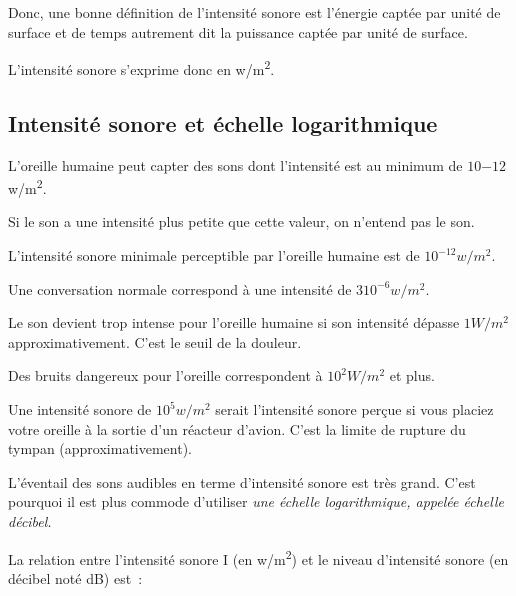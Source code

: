 Donc, une bonne définition de l'intensité sonore est l'énergie
captée par unité de surface et de temps autrement dit la puissance
captée par unité de surface. 

L'intensité sonore s'exprime donc en \si{w/m^2}.

\subsection{Intensité sonore et échelle logarithmique}

L'oreille humaine peut capter des sons dont l'intensité est
au minimum de $10{-12}$ \si{w/m^2}.

Si le son a une intensité plus petite que cette valeur, on n'entend pas
le son.

L'intensité sonore minimale perceptible par l'oreille humaine est de
$10^{-12} \si{w/m^2}$.

Une conversation normale correspond à une intensité de
$3 10^{-6} \si{w/m^2}$.

Le son devient trop intense pour l'oreille humaine si son intensité
dépasse  $1 \si{W/m^2}$ approximativement. C'est le seuil de
la douleur.

Des bruits dangereux pour l'oreille correspondent à
$10^2 \si{W/m^2}$ et plus.

Une intensité sonore de $10^5 \si{w/m^2}$ serait l'intensité sonore perçue si vous placiez votre oreille à la
sortie d'un réacteur d'avion. C'est la limite de rupture du tympan
(approximativement).

L'éventail des sons audibles en terme d'intensité sonore est très grand.
C'est pourquoi il est plus commode d'utiliser \emph{une échelle
logarithmique, appelée échelle décibel. }

La relation entre l'intensité sonore I (en \si{w/m^2}) et le
niveau d'intensité sonore  (en décibel noté \si{dB}) est~:


